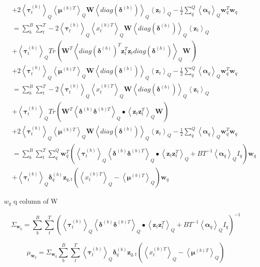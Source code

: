 \documentclass[10pt]{article}
\newcommand{\Angle}[1]{\left \langle #1 \right \rangle}
\newcommand{\Eq}[1]{\Angle{#1}_Q}
\begin{document}
\begin{align}
        & + 2\Eq{\bm{\tau}_t^{(b)}} \Eq{\bm{\mu}^{(b)T}}\bm{W}\Eq{diag(\bm{\delta}^{(b)})}\Eq{\bm{z}_t} -\frac{1}{2} \sum_q^Q\Eq{\bm{\alpha}_q}\bm{w}_q^T\bm{w}_q \nonumber \\
        & = \sum_b^B\sum_t^T -2\Eq{\bm{\tau}_t^{(b)}}\Eq{x_t^{(b)T}}\bm{W}\Eq{diag(\bm{\delta}^{(b)})}\Eq{\bm{z}_t} \nonumber \\
        & + \Eq{\bm{\tau}_t^{(b)}}Tr(\bm{W}^T\Eq{diag(\bm{\delta}^{(b)})^T\bm{z}_t^T\bm{z}_tdiag(\bm{\delta}^{(b)})}\bm{W}) \nonumber \\
        & + 2\Eq{\bm{\tau}_t^{(b)}} \Eq{\bm{\mu}^{(b)T}}\bm{W}\Eq{diag(\bm{\delta}^{(b)})}\Eq{\bm{z}_t} -\frac{1}{2} \sum_q^Q\Eq{\bm{\alpha}_q}\bm{w}_q^T\bm{w}_q \nonumber \\
        &= \sum_b^B\sum_t^T -2\Eq{\bm{\tau}_t^{(b)}}\Eq{x_t^{(b)T}}\bm{W}\Eq{diag(\bm{\delta}^{(b)})}\Eq{\bm{z}_t} \nonumber \\
        & + \Eq{\bm{\tau}_t^{(b)}}Tr(\bm{W}^T\Eq{\bm{\delta}^{(b)}\bm{\delta}^{(b)T}}\bullet\Eq{\bm{z}_t\bm{z}_t^T}\bm{W}) \nonumber \\
        & + 2\Eq{\bm{\tau}_t^{(b)}} \Eq{\bm{\mu}^{(b)T}}\bm{W}\Eq{diag(\bm{\delta}^{(b)})}\Eq{\bm{z}_t} -\frac{1}{2} \sum_q^Q\Eq{\bm{\alpha}_q}\bm{w}_q^T\bm{w}_q \nonumber \\
        &= \sum_b^B\sum_t^T\sum_q^Q\bm{w}_q^T(\Eq{\bm{\tau}_t^{(b)}}\Eq{\bm{\delta}^{(b)}\bm{\delta}^{(b)T}}\bullet\Eq{\bm{z}_t\bm{z}_t^T} + BT^{-1}\Eq{\bm{\alpha}_q}I_q)\bm{w}_q \nonumber \\
        &+ \Eq{\bm{\tau}_t^{(b)}}\bm{\delta}^{(b)}_q\bm{z}_{q,t}(\Eq{x_t^{(b)T}} - \Eq{\bm{\mu}^{(b)T}})\bm{w}_q
    \end{align}

    $w_q$ q column of W

    \begin{equation}
        \Sigma_{\bm{w}_q} = \sum_b^B\sum_t^T (\Eq{\bm{\tau}_t^{(b)}}\Eq{\bm{\delta}^{(b)}\bm{\delta}^{(b)T}}\bullet\Eq{\bm{z}_t\bm{z}_t^T} + BT^{-1}\Eq{\bm{\alpha}_q}I_q)^{-1}
    \end{equation}

    \begin{equation}
        \mu_{\bm{w}_q} = \Sigma_{\bm{w}_q}\sum_b^B\sum_t^T\Eq{\bm{\tau}_t^{(b)}}\bm{\delta}^{(b)}_q\bm{z}_{q,t}(\Eq{x_t^{(b)T}} - \Eq{\bm{\mu}^{(b)T}})
    \end{equation}
\end{document}
